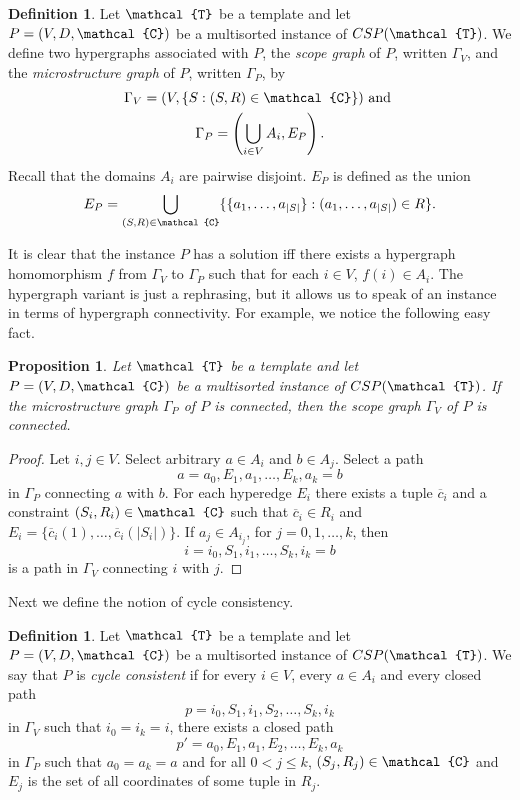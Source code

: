 \documentclass[11pt]{amsart}
\newcommand{\vr}[1]{{\uppercase {\mathcal{#1}}}}
\newtheorem{prp}[thm]{Proposition}
\theoremstyle{definition}
\newtheorem{df}[thm]{Definition}
\begin{document}
\begin{df}\label{probhypergraphs} Let $\vr t$ be a template and let $P=(V,D,\vr c)$ be a multisorted instance of $CSP(\vr t)$. We define two hypergraphs associated with $P$, the {\em scope graph} of $P$, written $\Gamma_V$, and the {\em microstructure graph} of $P$, written $\Gamma_P$, by
$$
\begin{gathered}
\Gamma_V=(V,\{S:(S,R)\in \vr c\})\text{ and }\\
\Gamma_P=\left(\bigcup\limits_{i\in V}A_i,E_P\right).
\end{gathered}
$$
Recall that the domains $A_i$ are pairwise disjoint. $E_P$ is defined as the union
$$E_P=\bigcup\limits_{(S,R)\in \vr c}\{\{a_1,\dots,a_{|S|}\}:(a_1,\dots,a_{|S|})\in R\}.$$
\end{df}

It is clear that the instance $P$ has a solution iff there exists a hypergraph homomorphism $f$ from $\Gamma_V$ to $\Gamma_P$ such that for each $i\in V$, $f(i)\in A_i$. The hypergraph variant is just a rephrasing, but it allows us to speak of an instance in terms of hypergraph connectivity. For example, we notice the following easy fact.

\begin{prp}\label{hyperconnPimpliesV}
Let $\vr t$ be a template and let $P=(V,D,\vr c)$ be a multisorted instance of $CSP(\vr t)$. If the microstructure graph $\Gamma_P$ of $P$ is connected, then the scope graph $\Gamma_V$ of $P$ is connected.
\end{prp}

\begin{proof}
Let $i,j\in V$. Select arbitrary $a\in A_i$ and $b\in A_j$. Select a path
\[a=a_0,E_1,a_1,\dots,E_k,a_k=b\]
in $\Gamma_P$ connecting $a$ with $b$. For each hyperedge $E_i$ there exists a tuple $\overline{c}_i$ and a constraint $(S_i,R_i)\in\vr c$ such that $\overline{c}_i\in R_i$ and $E_i=\{\overline{c}_i(1),\dots,\overline{c}_i(|S_i|)\}$. If $a_j\in A_{i_j}$, for $j=0,1,\dots,k$, then
\[i=i_0,S_1,i_1,\dots,S_k,i_k=b\]
is a path in $\Gamma_V$ connecting $i$ with $j$.
\end{proof}

Next we define the notion of cycle consistency.

\begin{df}\label{cyclecons}
Let $\vr t$ be a template and let $P=(V,D,\vr c)$ be a multisorted instance of $CSP(\vr t)$. We say that $P$ is {\em cycle consistent} if for every $i\in V$, every $a\in A_i$ and every closed path 
\[p=i_0,S_1,i_1,S_2,\dots,S_k,i_k\]
in $\Gamma_V$ such that $i_0=i_k=i$, there exists a closed path
\[p'=a_0,E_1,a_1,E_2,\dots,E_k,a_k\]
in $\Gamma_P$ such that $a_0=a_k=a$ and for all $0<j\leq k$, $(S_j,R_j)\in\vr c$ and $E_j$ is the set of all coordinates of some tuple in $R_j$.
\end{df}
\end{document}
